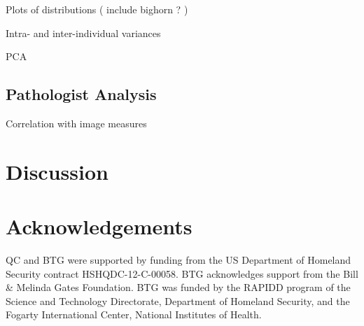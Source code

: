 \documentclass[10pt]{article}
\begin{document}
Plots of distributions ( include bighorn ? )

Intra- and inter-individual variances

PCA







\subsection*{Pathologist Analysis}

Correlation with image measures









\section*{Discussion}








	 






































\section*{Acknowledgements}

QC and BTG were supported by funding from the US Department of Homeland Security contract HSHQDC-12-C-00058. BTG acknowledges support from the Bill \& Melinda Gates Foundation. BTG was funded by the RAPIDD program of the Science and Technology Directorate, Department of Homeland Security, and the Fogarty International Center, National Institutes of Health. 
\end{document}
